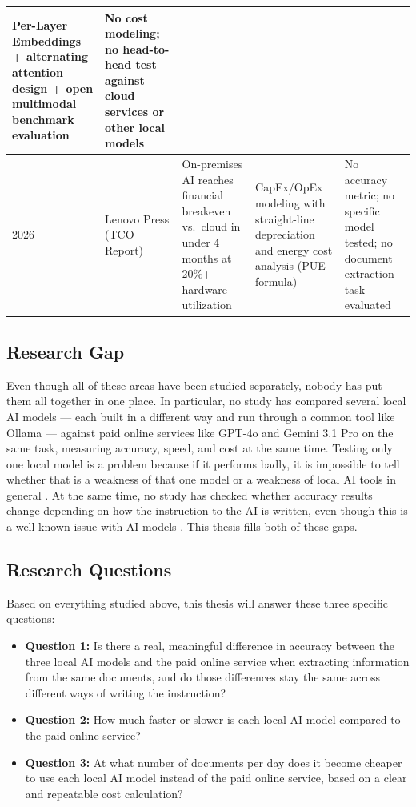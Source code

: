 \begin{table}[h!]
\begin{tabular}{|p{0.7cm}|p{2.5cm}|p{3.7cm}|p{3.2cm}|p{3.7cm}|}
Per-Layer Embeddings + alternating attention design + open multimodal benchmark evaluation &
No cost modeling; no head-to-head test against cloud services or other local models \\
\hline
2026 &
Lenovo Press \cite{lenovo_tco_2026} \newline (TCO Report) &
On-premises AI reaches financial breakeven vs.\ cloud in under 4 months at 20\%+ hardware utilization &
CapEx/OpEx modeling with straight-line depreciation and energy cost analysis (PUE formula) &
No accuracy metric; no specific model tested; no document extraction task evaluated \\
\hline
\end{tabular}
\end{table}

\subsection{Research Gap}

Even though all of these areas have been studied separately, nobody has put them all together in one place. In particular, no study has compared several local AI models --- each built in a different way and run through a common tool like Ollama --- against paid online services like GPT-4o \cite{openai_gpt4o_2024} and Gemini 3.1 Pro \cite{google_gemini_2025} on the same task, measuring accuracy, speed, and cost at the same time. Testing only one local model is a problem because if it performs badly, it is impossible to tell whether that is a weakness of that one model or a weakness of local AI tools in general \cite{gemma4_phi4_qwen3_2026}. At the same time, no study has checked whether accuracy results change depending on how the instruction to the AI is written, even though this is a well-known issue with AI models \cite{anlsstar_2024}. This thesis fills both of these gaps.

\subsection{Research Questions}

Based on everything studied above, this thesis will answer these three specific questions:

\begin{itemize}
    \item \textbf{Question 1:} Is there a real, meaningful difference in accuracy between the three local AI models and the paid online service when extracting information from the same documents, and do those differences stay the same across different ways of writing the instruction?
    \item \textbf{Question 2:} How much faster or slower is each local AI model compared to the paid online service?
    \item \textbf{Question 3:} At what number of documents per day does it become cheaper to use each local AI model instead of the paid online service, based on a clear and repeatable cost calculation?
\end{itemize}

